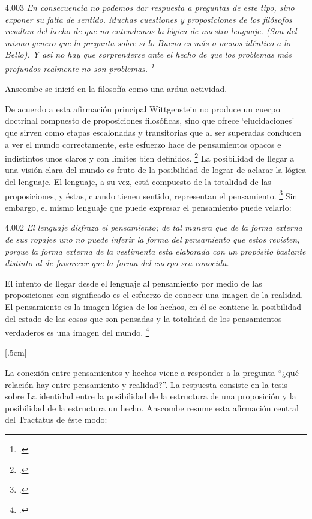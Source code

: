\documentclass[../main.tex]{subfiles}
\begin{document}
4.003 \emph{En consecuencia no podemos dar respuesta a preguntas de este tipo, sino exponer su falta de sentido. Muchas cuestiones y proposiciones de los filósofos resultan del hecho de que no entendemos la lógica de nuestro lenguaje. (Son del mismo genero que la pregunta sobre si lo Bueno es más o menos idéntico a lo Bello). Y así no hay que sorprenderse ante el hecho de que los problemas más profundos realmente no son problemas. \footcite[4.003 p. 45]{tractatus}}

Anscombe se inició en la filosofía como una ardua actividad.

De acuerdo a esta afirmación principal Wittgenstein no produce un cuerpo doctrinal compuesto de proposiciones filosóficas, sino que ofrece `elucidaciones' que sirven como etapas escalonadas y transitorias que al ser superadas conducen a ver el mundo correctamente, este esfuerzo hace de pensamientos opacos e indistintos unos claros y con límites bien definidos. \footcite[cf. 4.112 y 6.54]{tractatus} La posibilidad de llegar a una visión clara del mundo es fruto de la posibilidad de lograr de aclarar la lógica del lenguaje. El lenguaje, a su vez, está compuesto de la totalidad de las proposiciones, y éstas, cuando tienen sentido, representan el pensamiento. \footcite[cf. 4 y 4.001]{tractatus} Sin embargo, el mismo lenguaje que puede expresar el pensamiento puede velarlo:

4.002 \emph{El lenguaje disfraza el pensamiento; de tal manera que de la forma externa de sus ropajes uno no puede inferir la forma del pensamiento que estos revisten, porque la forma externa de la vestimenta esta elaborada con un propósito bastante distinto al de favorecer que la forma del cuerpo sea conocida.}

El intento de llegar desde el lenguaje al pensamiento por medio de las proposiciones con significado es el esfuerzo de conocer una imagen de la realidad. El pensamiento es la imagen lógica de los hechos, en él se contiene la posibilidad del estado de las cosas que son pensadas y la totalidad de los pensamientos verdaderos es una imagen del mundo. \footcite[cf. 3 y 3.001]{tractatus}

[.5cm]

La conexión entre pensamientos y hechos viene a responder a la pregunta ``¿qué relación hay entre pensamiento y realidad?''. La respuesta consiste en la tesis sobre La identidad entre la posibilidad de la estructura de una proposición y la posibilidad de la estructura un hecho. Anscombe resume esta afirmación central del Tractatus de éste modo:
\end{document}
